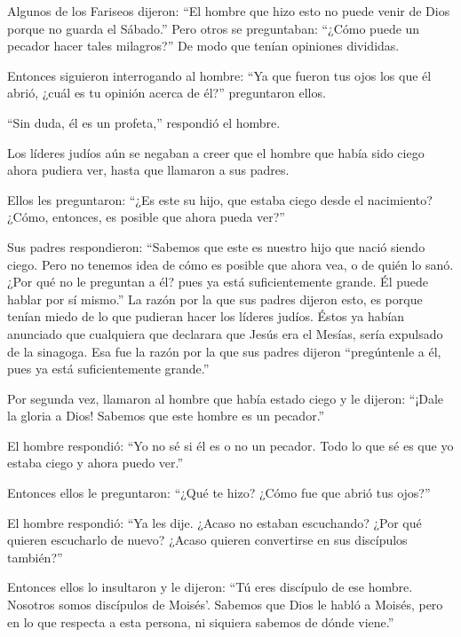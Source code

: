  Algunos de los Fariseos dijeron: ``El hombre que hizo esto
no puede venir de Dios porque no guarda el Sábado.'' Pero otros se
preguntaban: ``¿Cómo puede un pecador hacer tales milagros?'' De modo
que tenían opiniones divididas.

 Entonces siguieron interrogando al hombre: ``Ya que fueron
tus ojos los que él abrió, ¿cuál es tu opinión acerca de él?''
preguntaron ellos.

``Sin duda, él es un profeta,'' respondió el hombre.

 Los líderes judíos aún se negaban a creer que el hombre
que había sido ciego ahora pudiera ver, hasta que llamaron a sus padres.

 Ellos les preguntaron: ``¿Es este su hijo, que estaba
ciego desde el nacimiento? ¿Cómo, entonces, es posible que ahora pueda
ver?''

 Sus padres respondieron: ``Sabemos que este es nuestro
hijo que nació siendo ciego.  Pero no tenemos idea de cómo
es posible que ahora vea, o de quién lo sanó. ¿Por qué no le preguntan a
él? pues ya está suficientemente grande. Él puede hablar por sí mismo.''
 La razón por la que sus padres dijeron esto, es porque
tenían miedo de lo que pudieran hacer los líderes judíos. Éstos ya
habían anunciado que cualquiera que declarara que Jesús era el Mesías,
sería expulsado de la sinagoga.  Esa fue la razón por la
que sus padres dijeron ``pregúntenle a él, pues ya está suficientemente
grande.''

 Por segunda vez, llamaron al hombre que había estado ciego
y le dijeron: ``¡Dale la gloria a Dios! Sabemos que este hombre es un
pecador.''

 El hombre respondió: ``Yo no sé si él es o no un pecador.
Todo lo que sé es que yo estaba ciego y ahora puedo ver.''

 Entonces ellos le preguntaron: ``¿Qué te hizo? ¿Cómo fue
que abrió tus ojos?''

 El hombre respondió: ``Ya les dije. ¿Acaso no estaban
escuchando? ¿Por qué quieren escucharlo de nuevo? ¿Acaso quieren
convertirse en sus discípulos también?''

 Entonces ellos lo insultaron y le dijeron: ``Tú eres
discípulo de ese hombre.  Nosotros somos discípulos de
Moisés'. Sabemos que Dios le habló a Moisés, pero en lo que respecta a
esta persona, ni siquiera sabemos de dónde viene.''

